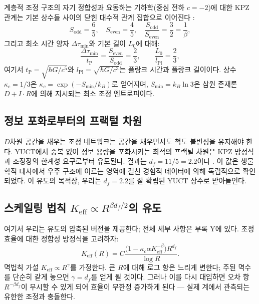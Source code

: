 \documentclass[11pt,a4paper]{article}
\newcommand{\kappac}{\kappa_c}
\newcommand{\Keff}{K_{\mathrm{eff}}}
\newcommand{\betaf}{\beta}
\newcommand{\Lpl}{l_{\mathrm{Pl}}}
\newcommand{\tP}{t_{\mathrm{P}}}
\newcommand{\Sodd}{S_{\mathrm{odd}}}
\newcommand{\Seven}{S_{\mathrm{even}}}
\newcommand{\Dtau}{\Delta\tau_{\min}}
\newcommand{\Lzero}{L_0}
\begin{document}
	계층적 조정 구조의 자기 정합성과 요동하는 기하학(중심 전하 \(c=-2\))에 대한 KPZ 관계는 기본 상수들 사이의 닫힌 대수적 관계 집합으로 이어진다 \cite{AppendixY}:
	\begin{equation}
		\Sodd = \frac{6}{5},\quad \Seven = \frac{4}{5},\quad \frac{\Sodd}{\Seven} = \frac{3}{2} = \frac{1}{\betaf},
	\end{equation}
	그리고 최소 시간 양자 \(\Dtau\)와 기본 길이 \(\Lzero\)에 대해:
	\begin{equation}
		\frac{\Dtau}{\tP} = \frac{\Seven}{\Sodd} = \frac{2}{3}, \qquad \frac{\Lzero}{\Lpl} = \frac{2}{3},
		\label{eq:algebraic-loop}
	\end{equation}
	여기서 \(\tP = \sqrt{\hbar G / c^5}\)와 \(\Lpl = \sqrt{\hbar G / c^3}\)는 플랑크 시간과 플랑크 길이이다. 상수 \(\kappac = 1/3\)은 \(\kappac = \exp(-S_{\min}/k_B)\)로 얻어지며, \(S_{\min} = k_B \ln 3\)은 삼원 존재론 \(D + I \cdot R\)에 의해 지시되는 최소 조정 엔트로피이다.
	
	\subsection{정보 포화로부터의 프랙털 차원}
	
	\(D\)차원 공간을 채우는 조정 네트워크는 공간을 채우면서도 척도 불변성을 유지해야 한다. YUCT에서 중복 없이 정보 용량을 포화시키는 최적의 프랙털 차원은 KPZ 방정식과 조정장의 한계성 요구로부터 유도된다. 결과는 \(d_f = 11/5 = 2.2\)이다 \cite{AppendixL}. 이 값은 생물학적 대사에서 우주 구조에 이르는 영역에 걸친 경험적 데이터에 의해 독립적으로 확인되었다. 이 유도의 목적상, 우리는 \(d_f = 2.2\)를 잘 확립된 YUCT 상수로 받아들인다.
	
	\subsection{스케일링 법칙 \(\Keff \propto R^{\beta d_f/2}\)의 유도}
	
	여기서 우리는 유도의 압축된 버전을 제공한다; 전체 세부 사항은 부록 Y에 있다. 조정 효율에 대한 정합성 방정식을 고려하자:
	\begin{equation}
		\Keff(R) = C \frac{\bigl(1 - \kappac \alpha \Keff^{-\betaf}\bigr) R^{d_f}}{\log R}.
		\label{eq:consistency}
	\end{equation}
	멱법칙 가설 \(\Keff \propto R^{\gamma}\)를 가정한다. 큰 \(R\)에 대해 로그 항은 느리게 변한다; 주된 멱수를 단순히 같게 놓으면 \(\gamma = d_f\)를 얻게 될 것이다. 그러나 이를 다시 대입하면 오차 항 \(R^{-\beta d_f}\)이 무시할 수 있게 되어 효율이 무한정 증가하게 된다 — 실제 계에서 관측되는 유한한 조정과 충돌한다.
	
\end{document}
